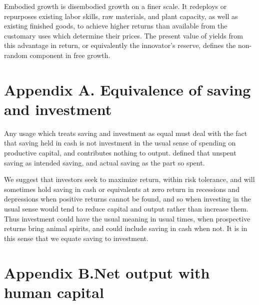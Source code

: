 \documentclass[a4paper,fleqn]{latex_styles/cas-sc}
\begin{document}
Embodied growth is disembodied growth on a finer scale. It redeploys or
repurposes existing labor skills, raw materials, and plant capacity, as
well as existing finished goods, to achieve higher returns than
available from the customary uses which determine their prices. The
present value of yields from this advantage in return, or equivalently
the innovator's reserve, defines the non-random component in free growth.

\appendix
\renewcommand{\theequation}{A.\arabic{equation}}
\setcounter{equation}{0}

\hypertarget{appendix-a}{
\section*{Appendix A. \hspace{0.5em}Equivalence of saving and investment}\label{appendix-a}
}

Any usage which treats saving and investment as equal must deal with the fact that saving held in cash is not investment in the usual sense of spending on productive capital, and contributes nothing to output. \cite{keynesGeneralTheoryEmployment1936} defined that unspent saving as intended saving, and actual saving as the part so spent.

We suggest that investors seek to maximize return, within risk tolerance, and will sometimes hold saving in cash or equivalents at zero return in recessions and depressions when positive returns cannot be found, and so when investing in the usual sense would tend to reduce capital and output rather than increase them. Thus investment could have the usual meaning in usual times, when prospective returns bring animal spirits, and could include saving in cash when not. It is in this sense that we equate saving to investment.

\renewcommand{\theequation}{B.\arabic{equation}}
\setcounter{equation}{0}

\hypertarget{appendix}{%
\section*{Appendix B.\hspace{0.5em}Net output with human
capital}\label{appendix}}
\end{document}
